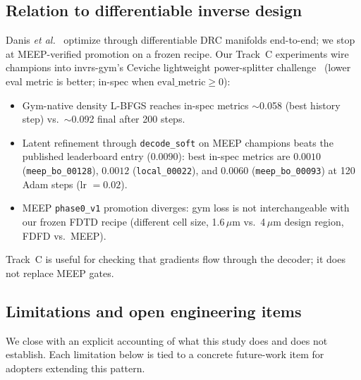 \documentclass[11pt,a4paper]{article}
\begin{document}
\subsection{Relation to differentiable inverse design}

Danis \emph{et al.}~\cite{Danis2026DRCManifold} optimize through differentiable DRC manifolds end-to-end; we stop at MEEP-verified promotion on a frozen recipe.
Our Track~C experiments wire champions into invrs-gym's Ceviche lightweight power-splitter challenge~\cite{Christiansen2024InvrsGym,Fan2019Ceviche,Schubert2022CevicheChallenges} (lower eval metric is better; in-spec when $\mathrm{eval\_metric} \ge 0$):
\begin{itemize}
  \item Gym-native density L-BFGS reaches in-spec metrics $\sim$0.058 (best history step) vs.\ $\sim$0.092 final after 200 steps.
  \item Latent refinement through \texttt{decode\_soft} on MEEP champions beats the published leaderboard entry ($0.0090$): best in-spec metrics are $0.0010$ (\texttt{meep\_bo\_00128}), $0.0012$ (\texttt{local\_00022}), and $0.0060$ (\texttt{meep\_bo\_00093}) at 120 Adam steps (lr $=0.02$).
  \item MEEP \texttt{phase0\_v1} promotion diverges: gym loss is not interchangeable with our frozen FDTD recipe (different cell size, 1.6\,$\mu$m vs.\ 4\,$\mu$m design region, FDFD vs.\ MEEP).
\end{itemize}
Track~C is useful for checking that gradients flow through the decoder; it does not replace MEEP gates.

\subsection{Limitations and open engineering items}

We close with an explicit accounting of what this study does and does not establish.
Each limitation below is tied to a concrete future-work item for adopters extending this pattern.
\end{document}
